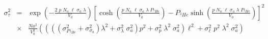 


\begin{eqnarray*}
\sigma_\tau^2 & = & \exp \left(-\frac{2 \; p \; N_a \; \ell \; \sigma_a \; \lambda}{V_0} \right) \left[\cosh \left( \frac{p \; N_a \; \ell \; \sigma_a \; \lambda \;  P_{^{3}He}}{V_0} \right) - P_{^3He} \sinh \left(\frac{p \; N_a \; \ell \; \sigma_a \; \lambda \;  P_{^{3}He}}{V_0}\right)\right]^2\\
& \times & \frac{Na^2}{V_0^2} \left(\left(\left(\left( \sigma_{P_{^3He}}^2 + \sigma_{\sigma_a}^2 \right) \lambda^2 + \sigma_\lambda^2 \; \sigma_a^2 \right) p^2 + \sigma_p^2 \; \lambda^2 \; \sigma_a^2 \right) \ell^2 + \sigma_\ell^2 \; p^2 \; \lambda^2 \; \sigma_a^2\right)\\
\end{eqnarray*}

